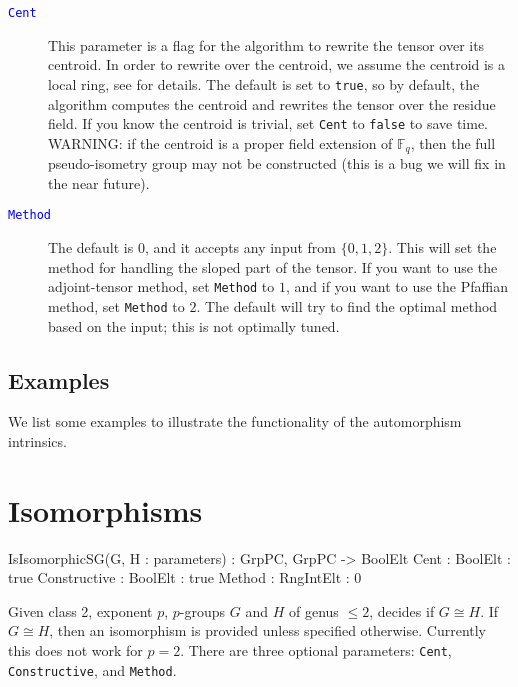 \documentclass{documentation}
\begin{document}
\begin{description}
\item[\textcolor{blue}{\tt Cent}]
This parameter is a flag for the algorithm to rewrite the tensor over its centroid. 
In order to rewrite over the centroid, we assume the centroid is a local ring, see \cite{eMAGma} for details.
The default is set to {\tt true}, so by default, the algorithm computes the centroid and rewrites the tensor over the residue field.
If you know the centroid is trivial, set {\tt Cent} to {\tt false} to save time.
WARNING: if the centroid is a proper field extension of $\mathbb{F}_q$, then the full pseudo-isometry group may not be constructed (this is a bug we will fix in the near future).
\item[\textcolor{blue}{\tt Method}]
The default is $0$, and it accepts any input from $\{ 0,1,2\}$. 
This will set the method for handling the sloped part of the tensor.
If you want to use the adjoint-tensor method, set {\tt Method} to $1$, and if you want to use the Pfaffian method, set {\tt Method} to $2$. The default will try to find the optimal method based on the input; this is not optimally tuned.
\end{description}

\section{Examples}
We list some examples to illustrate the functionality of the automorphism intrinsics.

\chapter{Isomorphisms}

\begin{intrinsics}
IsIsomorphicSG(G, H : parameters) : GrpPC, GrpPC -> BoolElt
    Cent : BoolElt : true
    Constructive : BoolElt : true
    Method : RngIntElt : 0
\end{intrinsics}

Given class 2, exponent $p$, $p$-groups $G$ and $H$ of genus $\leq 2$, decides if $G\cong H$.
If $G\cong H$, then an isomorphism is provided unless specified otherwise.
Currently this does not work for $p=2$.  
There are three optional parameters: {\tt Cent}, {\tt Constructive}, and {\tt Method}.
\end{document}
